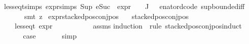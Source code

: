 \begin{isabellebody}
less{\isacharunderscore}{\kern0pt}eq{\isacharunderscore}{\kern0pt}t{\isachardot}{\kern0pt}simps\ expr{\isachardot}{\kern0pt}simps\ {\isacartoucheopen}Sup\ {\isacharparenleft}{\kern0pt}{\isacharparenleft}{\kern0pt}eSuc\ {\isasymcirc}\ expr{\isacharunderscore}{\kern0pt}{}\ {\isasymcirc}\ {\isasymPhi}{\isacharparenright}{\kern0pt}\ {\isacharbackquote}{\kern0pt}\ J{\isacharparenright}{\kern0pt}\ {\isasymle}\ {}{\isacartoucheclose}\ enat{\isacharunderscore}{\kern0pt}ord{\isacharunderscore}{\kern0pt}code{\isacharparenleft}{\kern0pt}{}{\isacharparenright}{\kern0pt}\ sup{\isachardot}{\kern0pt}bounded{\isacharunderscore}{\kern0pt}iff\isanewline
\ \ \ \ \isamarkupfalse%
\ {\isacharparenleft}{\kern0pt}smt\ {\isacharparenleft}{\kern0pt}z{}{\isacharparenright}{\kern0pt}{\isacharparenright}{\kern0pt}\isanewline
{}\isamarkupfalse%
%
\endisatagproof
{\isafoldproof}%
%
\isadelimproof
\isanewline
%
\endisadelimproof
\isanewline
{}\isamarkupfalse%
\ expr{\isacharunderscore}{\kern0pt}stacked{\isacharunderscore}{\kern0pt}pos{\isacharunderscore}{\kern0pt}conj{\isacharunderscore}{\kern0pt}pos{\isacharcolon}{\kern0pt}\isanewline
\ \ \ {\isachardoublequoteopen}stacked{\isacharunderscore}{\kern0pt}pos{\isacharunderscore}{\kern0pt}conj{\isacharunderscore}{\kern0pt}pos\ {\isasymphi}{\isachardoublequoteclose}\isanewline
\ \ \ {\isachardoublequoteopen}less{\isacharunderscore}{\kern0pt}eq{\isacharunderscore}{\kern0pt}t\ {\isacharparenleft}{\kern0pt}expr\ {\isasymphi}{\isacharparenright}{\kern0pt}\ {\isacharparenleft}{\kern0pt}{}{\isacharcomma}{\kern0pt}\ {\isasyminfinity}{\isacharcomma}{\kern0pt}\ {}{\isacharcomma}{\kern0pt}\ {}{\isacharcomma}{\kern0pt}\ {}{\isacharcomma}{\kern0pt}\ {}{\isacharparenright}{\kern0pt}{\isachardoublequoteclose}\isanewline
%
\isadelimproof
\ \ %
\endisadelimproof
%
\isatagproof
{}\isamarkupfalse%
\ assms\isanewline
{}\isamarkupfalse%
{\isacharparenleft}{\kern0pt}induction\ {\isasymphi}\ rule{\isacharcolon}{\kern0pt}\ stacked{\isacharunderscore}{\kern0pt}pos{\isacharunderscore}{\kern0pt}conj{\isacharunderscore}{\kern0pt}pos{\isachardot}{\kern0pt}induct{\isacharparenright}{\kern0pt}\isanewline
\ \ \isamarkupfalse%
\ {}\isanewline
\ \ \isamarkupfalse%
\ \isamarkupfalse%
\ {\isacharquery}{\kern0pt}case\ \isanewline
\ \ \ \ \isamarkupfalse%
\ simp\isanewline
{}\isamarkupfalse%

\end{isabellebody}
